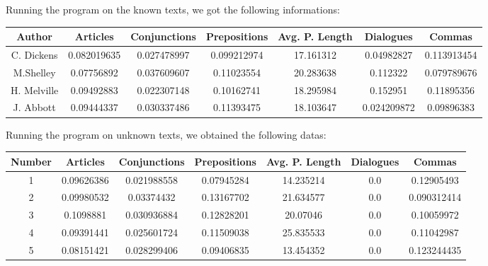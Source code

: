 \documentclass[a4paper,11pt, twoside]{article}
\begin{document}
	Running the program on the known texts, we got the following informations:
	\begin{center}
		\begin{tabular}{ccccccc}
			\toprule
			Author  & Articles & Conjunctions & Prepositions & Avg. P. Length & Dialogues & Commas \\
			\midrule
			C. Dickens & 0.082019635 & 0.027478997 & 0.099212974 & 17.161312 & 0.04982827 & 0.113913454 \\
			M.Shelley & 0.07756892 & 0.037609607 & 0.11023554 & 20.283638 & 0.112322 & 0.079789676 \\
			H. Melville & 0.09492883 & 0.022307148 & 0.10162741 & 18.295984 & 0.152951 & 0.11895356 \\
			J. Abbott & 0.09444337 & 0.030337486 & 0.11393475 & 18.103647 & 0.024209872 & 0.09896383 \\
			\bottomrule
		\end{tabular}
	\end{center}
	\bigskip

	Running the program on unknown texts, we obtained the following datas:
	\begin{center}
		\begin{tabular}{ccccccc}
			\toprule
			Number & Articles & Conjunctions & Prepositions & Avg. P. Length & Dialogues & Commas \\
			\midrule
			1 & 0.09626386 & 0.021988558 & 0.07945284 & 14.235214 & 0.0 & 0.12905493 \\
			2 & 0.09980532 & 0.03374432 & 0.13167702 & 21.634577 & 0.0 & 0.090312414\\
			3 & 0.1098881 & 0.030936884 & 0.12828201 & 20.07046 & 0.0 & 0.10059972\\
			4 & 0.09391441 & 0.025601724 & 0.11509038 & 25.835533 & 0.0 & 0.11042987\\
			5 & 0.08151421 & 0.028299406 & 0.09406835 & 13.454352 & 0.0 & 0.123244435\\
			\bottomrule
		\end{tabular}
	\end{center}
	\newpage

	\printbibheading
	\printbibliography[nottype=book,heading=subbibliography,title={Online Sources}]
\end{document}

